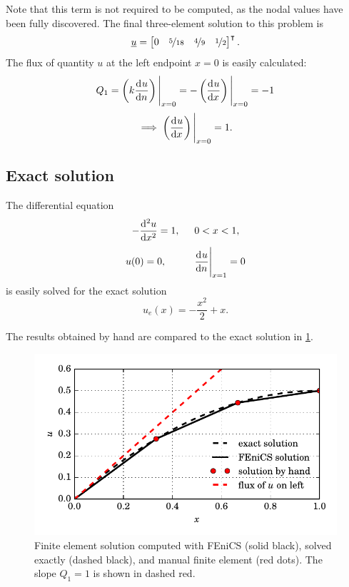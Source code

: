 Note that this term is not required to be computed, as the nodal values have been fully discovered.  The final three-element solution to this problem is
$$\rankone{u} = \begin{bmatrix} 0 & \nicefrac{5}{18} & \nicefrac{4}{9} & \nicefrac{1}{2} \end{bmatrix}\T.$$
The flux of quantity $u$ at the left endpoint $x = 0$ is easily calculated:
$$Q_1 = \left(k \totder{u}{n} \right) \Bigg|_{x=0} = - \left(\totder{u}{x} \right) \Bigg|_{x=0} = -1$$ 
$$\implies \left(\totder{u}{x} \right) \Bigg|_{x=0} = 1.$$

\subsection{Exact solution}

The differential equation
$$- \totder[2]{u}{x} = 1, \hspace{5mm} 0 < x < 1,$$
$$u(0) = 0, \hspace{10mm} \totder{u}{n} \Bigg|_{x=1} = 0$$
is easily solved for the exact solution
$$u_e(x) = -\frac{x^2}{2} + x.$$

The results obtained by hand are compared to the exact solution in \cref{scratch_ex_image}.

\begin{figure}
  \centering
    \includegraphics[width=\linewidth]{images/fenics_intro/scratch_example.pdf}
  \caption[Introductory FEM example solution]{Finite element solution computed with FEniCS (solid black), solved exactly (dashed black), and manual finite element (red dots).  The slope $Q_1 = 1$ is shown in dashed red.}
  \label{scratch_ex_image}
\end{figure}


